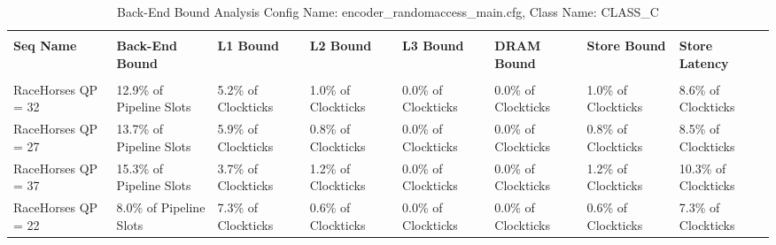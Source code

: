 \documentclass{article}%
\begin{document}
\begin{longtabu}{| X[l] | X[l] | X[l] | X[l] | X[l] | X[l] | X[l] | X[l] |}%
\caption{%
Back{-}End Bound Analysis\newline%
 Config Name: encoder\_randomaccess\_main.cfg,\newline%
 Class Name: CLASS\_C\newline%
%
}%
\hline%
&&&&&&&\\%
\textbf{Seq Name}&\textbf{Back{-}End Bound}&\textbf{L1 Bound}&\textbf{L2 Bound}&\textbf{L3 Bound}&\textbf{DRAM Bound}&\textbf{Store Bound}&\textbf{Store Latency}\\%
&&&&&&&\\%
\hline%
\endhead%
RaceHorses\newline%
 QP = 32&12.9\% of Pipeline Slots&5.2\% of Clockticks&1.0\% of Clockticks&0.0\% of Clockticks&0.0\% of Clockticks&1.0\% of Clockticks&8.6\% of Clockticks\\%
\hline%
RaceHorses\newline%
 QP = 27&13.7\% of Pipeline Slots&5.9\% of Clockticks&0.8\% of Clockticks&0.0\% of Clockticks&0.0\% of Clockticks&0.8\% of Clockticks&8.5\% of Clockticks\\%
\hline%
RaceHorses\newline%
 QP = 37&15.3\% of Pipeline Slots&3.7\% of Clockticks&1.2\% of Clockticks&0.0\% of Clockticks&0.0\% of Clockticks&1.2\% of Clockticks&10.3\% of Clockticks\\%
\hline%
RaceHorses\newline%
 QP = 22&8.0\% of Pipeline Slots&7.3\% of Clockticks&0.6\% of Clockticks&0.0\% of Clockticks&0.0\% of Clockticks&0.6\% of Clockticks&7.3\% of Clockticks\\%
\hline%
\end{longtabu}%
\newpage

%
\end{document}
